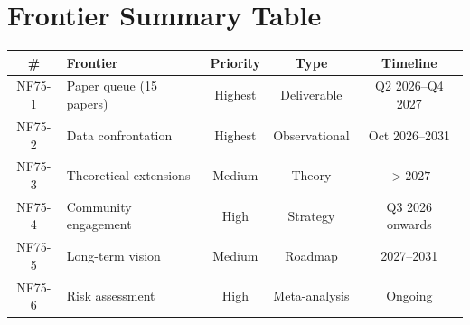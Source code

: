 \documentclass[11pt,a4paper]{article}
\begin{document}
\section{Frontier Summary Table}

\begin{center}
\begin{tabular}{clccc}
\toprule
\textbf{\#} & \textbf{Frontier} & \textbf{Priority} & \textbf{Type} & \textbf{Timeline} \\
\midrule
NF75-1 & Paper queue (15 papers) & Highest & Deliverable & Q2 2026--Q4 2027 \\
NF75-2 & Data confrontation & Highest & Observational & Oct 2026--2031 \\
NF75-3 & Theoretical extensions & Medium & Theory & $> 2027$ \\
NF75-4 & Community engagement & High & Strategy & Q3 2026 onwards \\
NF75-5 & Long-term vision & Medium & Roadmap & 2027--2031 \\
NF75-6 & Risk assessment & High & Meta-analysis & Ongoing \\
\bottomrule
\end{tabular}
\end{center}
\end{document}
